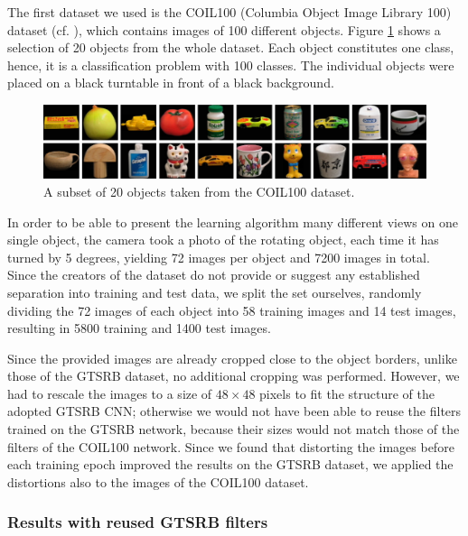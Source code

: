 \documentclass[11pt, a4paper]{article}
\begin{document}
The first dataset we used is the COIL100 (Columbia Object Image Library 100) dataset (cf. \cite{columbia_object_image_library}), which contains images of 100 different objects. Figure \ref{fig:coil100_objects} shows a selection of 20 objects from the whole dataset. Each object constitutes one class, hence, it is a classification problem with 100 classes. The individual objects were placed on a black turntable in front of a black background. 
\begin{figure}[h!]
	\centering
	\includegraphics[width=1\textwidth]{data_examples/coil100}
	\caption{A subset of 20 objects taken from the COIL100 dataset.}
	\label{fig:coil100_objects}
\end{figure}
In order to be able to present the learning algorithm many different views on one single object, the camera took a photo of the rotating object, each time it has turned by 5 degrees, yielding 72 images per object and 7200 images in total. Since the creators of the dataset do not provide or suggest any established separation into training and test data, we split the set ourselves, randomly dividing the 72 images of each object into 58 training images and 14 test images, resulting in 5800 training and 1400 test images.

Since the provided images are already cropped close to the object borders, unlike those of the GTSRB dataset, no additional cropping was performed. However, we had to rescale the images to a size of $48 \times 48$ pixels to fit the structure of the adopted GTSRB CNN; otherwise we would not have been able to reuse the filters trained on the GTSRB network, because their sizes would not match those of the filters of the COIL100 network. Since we found that distorting the images before each training epoch improved the results on the GTSRB dataset, we applied the distortions also to the images of the COIL100 dataset.

\subsubsection{Results with reused GTSRB filters}
\end{document}
